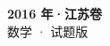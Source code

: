 \documentclass[zihao=-4, a4paper]{ctexart}
\begin{document}
\begin{center}
  {\Large\bfseries 2016 年·江苏卷}\\[4pt]
  {\large 数学 · 试题版}
\end{center}
\medskip
{}

\end{document}
